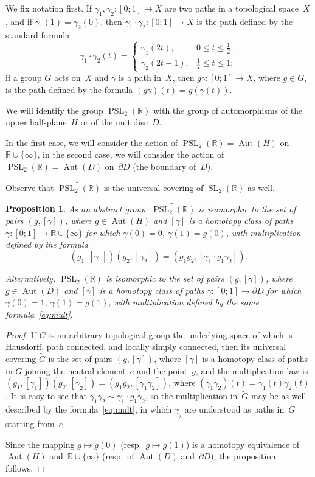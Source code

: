 \documentclass[11pt]{amsart}
\newcommand*{\R}{{\mathbb R}}
\newcommand*{\uPSL}{{\widetilde{\PSL_2(\R)}}}
\DeclareMathOperator{\Aut}{Aut}
\DeclareMathOperator{\PSL}{PSL}
\DeclareMathOperator{\SL}{SL}
\newtheorem{proposition}{Proposition}[section]
\theoremstyle{remark}
\theoremstyle{definition}
\begin{document}
We fix notation first. If $\gamma_1,\gamma_2\colon [0;1]\to X$ are two
paths in a topological space~$X$, and if $\gamma_1(1)=\gamma_2(0)$,
then $\gamma_1\cdot\gamma_2\colon [0;1]\to X$ is the path defined by
the standard formula
\begin{equation*}
\gamma_1\cdot\gamma_2(t)=
\begin{cases}
  \gamma_1(2t),&0\le t\le\frac12,\\
  \gamma_2(2t-1),&\frac12\le t\le1;
\end{cases}
\end{equation*}
if a group $G$ acts on~$X$ and $\gamma$ is a path in~$X$, then
$g\gamma\colon [0;1]\to X$, where $g\in G$, is the path defined by the
formula $(g\gamma)(t)=g(\gamma(t))$.

We will identify the group $\PSL_2(\R)$ with the group of
automorphisms of the upper half-plane~$H$ or of the unit disc~$D$.

In the first case, we will consider the action of $\PSL_2(\R)=\Aut(H)$
on $\R\cup\{\infty\}$, in the second case, we will consider the action
of $\PSL_2(\R)=\Aut(D)$ on~$\partial D$ (the boundary of~$D$).

Observe that $\uPSL$ is the universal covering of $\SL_2(\R)$ as well.

\begin{proposition}\label{description}
As an abstract group, $\uPSL$ is isomorphic to the set of pairs
$(g,[\gamma])$, where $g\in\Aut(H)$ and   $[\gamma]$ is a homotopy
class of paths $\gamma\colon [0;1]\to\R\cup\{\infty\}$ for which
$\gamma(0)=0$, $\gamma(1)=g(0)$, with multiplication defined by the
formula
\begin{equation}\label{eq:mult}
  (g_1,[\gamma_1])(g_2,[\gamma_2])=
(g_1g_2,[\gamma_1\cdot g_1\gamma_2]).
\end{equation}

Alternatively, $\uPSL$ is isomorphic to the set of pairs
$(g,[\gamma])$, where $g\in\Aut(D)$ and   $[\gamma]$ is a homotopy
class of paths $\gamma\colon [0;1]\to\partial D$ for which
$\gamma(0)=1$, $\gamma(1)=g(1)$, with multiplication defined by the
same formula~\eqref{eq:mult}.
\end{proposition}

\begin{proof}
If $G$ is an arbitrary topological group the
underlying space of which is Hausdorff, path connected, and locally simply
connected, then its universal covering $\tilde G$ is the set of pairs
$(g,[\gamma])$, where $[\gamma]$ is a homotopy class of paths in $G$
joining the neutral element~$e$ and the point~$g$, and the
multiplication law is
$(g_1,[\gamma_1])(g_2,[\gamma_2])=(g_1g_2,[\gamma_1\gamma_2])$,  
where $(\gamma_1\gamma_2)(t)=\gamma_1(t)\gamma_2(t)$. It is easy to
see that $\gamma_1\gamma_2\sim \gamma_1\cdot g_1\gamma_2$, so the
multiplication in~$\tilde G$ may be as well described by the
formula~\eqref{eq:mult}, in which $\gamma_j$ are understood as paths
in~$G$ starting from~$e$.

Since the mapping $g\mapsto g(0)$ (resp.\ $g\mapsto g(1)$) is a
homotopy equivalence of $\Aut(H)$ and~$\R\cup\{\infty\}$ (resp.\ of
$\Aut(D)$ and~$\partial D$), the proposition follows.
\end{proof}
\end{document}
